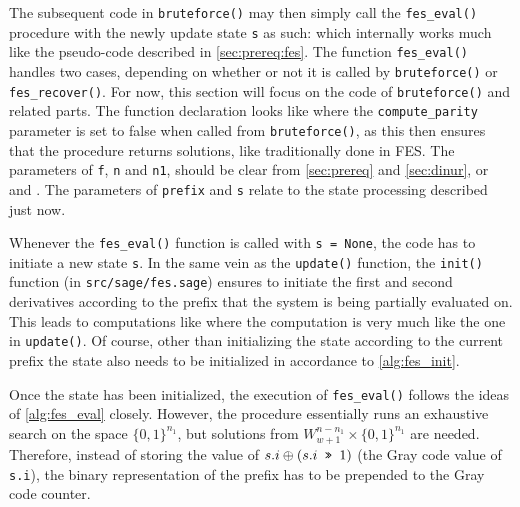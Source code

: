 The subsequent code in \texttt{bruteforce()} may then simply call the \texttt{fes\_eval()} procedure with the newly update state \texttt{s} as such:
which internally works much like the pseudo-code described in \cref{sec:prereq:fes}. The function \texttt{fes\_eval()} handles two cases, depending on whether or not it is called by \texttt{bruteforce()} or \texttt{fes\_recover()}. For now, this section will focus on the code of \texttt{bruteforce()} and related parts. The function declaration looks like
where the \texttt{compute\_parity} parameter is set to false when called from \texttt{bruteforce()}, as this then ensures that the procedure returns solutions, like traditionally done in FES. The parameters of \texttt{f}, \texttt{n} and \texttt{n1}, should be clear from \cref{sec:prereq} and \cref{sec:dinur}, or \cite{eurocrypt-2021-30841} and \cite{cryptoeprint:2013/436}. The parameters of \texttt{prefix} and \texttt{s} relate to the state processing described just now.

Whenever the \texttt{fes\_eval()} function is called with \texttt{s = None}, the code has to initiate a new state \texttt{s}. In the same vein as the \texttt{update()} function, the \texttt{init()} function (in \texttt{src/sage/fes.sage}) ensures to initiate the first and second derivatives according to the prefix that the system is being partially evaluated on. This leads to computations like
where the computation is very much like the one in \texttt{update()}. Of course, other than initializing the state according to the current prefix the state also needs to be initialized in accordance to \cref{alg:fes_init}.

Once the state has been initialized, the execution of \texttt{fes\_eval()} follows the ideas of \cref{alg:fes_eval} closely. However, the procedure essentially runs an exhaustive search on the space $\{0,1\}^{n_1}$, but solutions from $W^{n - n_1}_{w + 1} \times \{0, 1\}^{n_1}$ are needed. Therefore, instead of storing the value of $s.i \oplus (s.i \texttt{ >> } 1)$ (the Gray code value of \texttt{s.i}), the binary representation of the prefix has to be prepended to the Gray code counter. 


